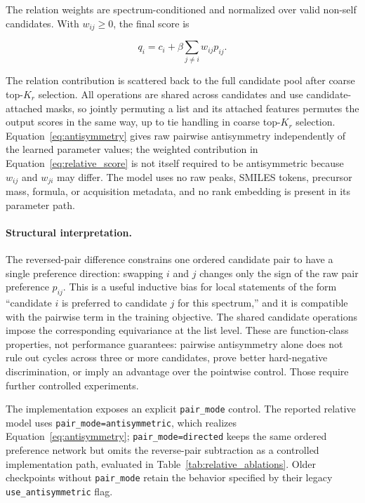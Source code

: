 \documentclass[runningheads]{llncs}
\begin{document}
The relation weights are spectrum-conditioned and normalized over valid
non-self candidates. With $w_{ij}\ge0$, the final score is

\begin{equation}
  q_i=c_i+\beta\sum_{j\ne i}w_{ij}p_{ij}.
  \label{eq:relative_score}
\end{equation}

The relation contribution is scattered back to the full candidate pool after
coarse top-$K_r$ selection. All operations are shared across candidates and
use candidate-attached masks, so jointly permuting a list and its attached
features permutes the output scores in the same way, up to tie handling in
coarse top-$K_r$ selection. Equation~\ref{eq:antisymmetry} gives raw pairwise
antisymmetry independently of the learned parameter values; the weighted
contribution in Equation~\ref{eq:relative_score} is not itself required to be
antisymmetric because $w_{ij}$ and $w_{ji}$ may differ.
The model uses no raw peaks, SMILES tokens, precursor mass, formula, or
acquisition metadata, and no rank embedding is present in its parameter path.

\paragraph{Structural interpretation.}
The reversed-pair difference constrains one ordered candidate pair to have a
single preference direction: swapping $i$ and $j$ changes only the sign of the
raw pair preference $p_{ij}$. This is a useful inductive bias for local statements of the
form ``candidate $i$ is preferred to candidate $j$ for this spectrum,'' and it
is compatible with the pairwise term in the training objective. The shared
candidate operations impose the corresponding equivariance at the list level.
These are function-class properties, not performance guarantees: pairwise
antisymmetry alone does not rule out cycles across three or more candidates,
prove better hard-negative discrimination, or imply an advantage over the
pointwise control. Those require further controlled experiments.

The implementation exposes an explicit \texttt{pair\_mode} control. The
reported relative model uses \texttt{pair\_mode=antisymmetric}, which realizes
Equation~\ref{eq:antisymmetry}; \texttt{pair\_mode=directed} keeps the same
ordered preference network but omits the reverse-pair subtraction as a
controlled implementation path, evaluated in Table~\ref{tab:relative_ablations}.
Older checkpoints without \texttt{pair\_mode} retain the behavior specified by
their legacy \texttt{use\_antisymmetric} flag.
\end{document}
